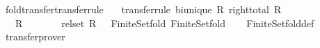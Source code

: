 \begin{isabellebody}
\isamarkupfalse%
%
\endisatagproof
{\isafoldproof}%
%
\isadelimproof
\isanewline
%
\endisadelimproof
\isanewline
{}\isamarkupfalse%
\ fold{\isacharunderscore}{\kern0pt}transfer{\isacharbrackleft}{\kern0pt}transfer{\isacharunderscore}{\kern0pt}rule{\isacharbrackright}{\kern0pt}{\isacharcolon}{\kern0pt}\isanewline
\ \ \ {\isacharbrackleft}{\kern0pt}transfer{\isacharunderscore}{\kern0pt}rule{\isacharbrackright}{\kern0pt}{\isacharcolon}{\kern0pt}\ {\isachardoublequoteopen}bi{\isacharunderscore}{\kern0pt}unique\ R{\isachardoublequoteclose}\ {\isachardoublequoteopen}right{\isacharunderscore}{\kern0pt}total\ R{\isachardoublequoteclose}\isanewline
\ \ \ {\isachardoublequoteopen}{\isacharparenleft}{\kern0pt}{\isacharparenleft}{\kern0pt}R\ {\isacharequal}{\kern0pt}{\isacharequal}{\kern0pt}{\isacharequal}{\kern0pt}{\isachargreater}{\kern0pt}\ {\isacharparenleft}{\kern0pt}{\isacharequal}{\kern0pt}{\isacharparenright}{\kern0pt}\ {\isacharequal}{\kern0pt}{\isacharequal}{\kern0pt}{\isacharequal}{\kern0pt}{\isachargreater}{\kern0pt}\ {\isacharparenleft}{\kern0pt}{\isacharequal}{\kern0pt}{\isacharparenright}{\kern0pt}{\isacharparenright}{\kern0pt}\ {\isacharequal}{\kern0pt}{\isacharequal}{\kern0pt}{\isacharequal}{\kern0pt}{\isachargreater}{\kern0pt}\ {\isacharparenleft}{\kern0pt}{\isacharequal}{\kern0pt}{\isacharparenright}{\kern0pt}\ {\isacharequal}{\kern0pt}{\isacharequal}{\kern0pt}{\isacharequal}{\kern0pt}{\isachargreater}{\kern0pt}\ rel{\isacharunderscore}{\kern0pt}set\ R\ {\isacharequal}{\kern0pt}{\isacharequal}{\kern0pt}{\isacharequal}{\kern0pt}{\isachargreater}{\kern0pt}\ {\isacharparenleft}{\kern0pt}{\isacharequal}{\kern0pt}{\isacharparenright}{\kern0pt}{\isacharparenright}{\kern0pt}\ Finite{\isacharunderscore}{\kern0pt}Set{\isachardot}{\kern0pt}fold\ Finite{\isacharunderscore}{\kern0pt}Set{\isachardot}{\kern0pt}fold{\isachardoublequoteclose}\isanewline
%
\isadelimproof
\ \ %
\endisadelimproof
%
\isatagproof
{}\isamarkupfalse%
\ Finite{\isacharunderscore}{\kern0pt}Set{\isachardot}{\kern0pt}fold{\isacharunderscore}{\kern0pt}def\isanewline
\ \ \isamarkupfalse%
\ transfer{\isacharunderscore}{\kern0pt}prover%
\endisatagproof
{\isafoldproof}%
%
\isadelimproof
\isanewline
%
\endisadelimproof
\isanewline
{}\isamarkupfalse%
\isanewline
\isanewline
%
\isadelimtheory
\isanewline
%
\endisadelimtheory
%
\isatagtheory
{}\isamarkupfalse%
%
\endisatagtheory
{\isafoldtheory}%
%
\isadelimtheory
%
\endisadelimtheory
%
\end{isabellebody}%

